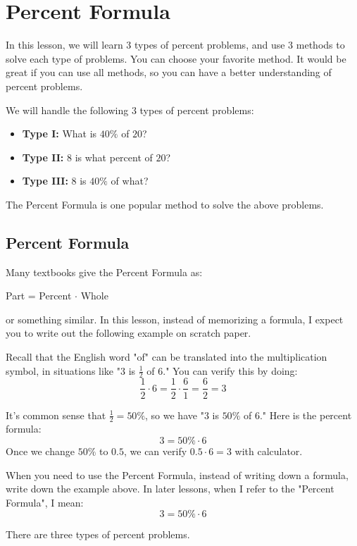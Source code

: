 
\section{Percent Formula}

In this lesson, we will learn $3$ types of percent problems, and use $3$ methods to solve each type of problems. You can choose your favorite method. It would be great if you can use all methods, so you can have a better understanding of percent problems.

We will handle the following $3$ types of percent problems:
\begin{itemize}
\item \textbf{Type I:} What is $40\%$ of $20$?
\item \textbf{Type II:} $8$ is what percent of $20$?
\item \textbf{Type III:} $8$ is $40\%$ of what?
\end{itemize}

The Percent Formula is one popular method to solve the above problems.

\subsection{Percent Formula}
Many textbooks give the Percent Formula as:
\begin{center}
Part = Percent $\cdot$ Whole
\end{center}
or something similar. In this lesson, instead of memorizing a formula, I expect you to write out the following example on scratch paper.

Recall that the English word "of" can be translated into the multiplication symbol, in situations like "$3$ is $\frac{1}{2}$ of $6$." You can verify this by doing:
\[ \frac{1}{2} \cdot 6 = \frac{1}{2} \cdot \frac{6}{1} = \frac{6}{2} = 3 \]

It's common sense that $\frac{1}{2}=50\%$, so we have "$3$ is $50\%$ of $6$." Here is the percent formula:
\[ 3 = 50\% \cdot 6 \]
Once we change $50\%$ to $0.5$, we can verify $0.5\cdot6=3$ with calculator.

When you need to use the Percent Formula, instead of writing down a formula, write down the example above. In later lessons, when I refer to the "Percent Formula", I mean: 
\[ 3 = 50\% \cdot 6 \]

There are three types of percent problems.

